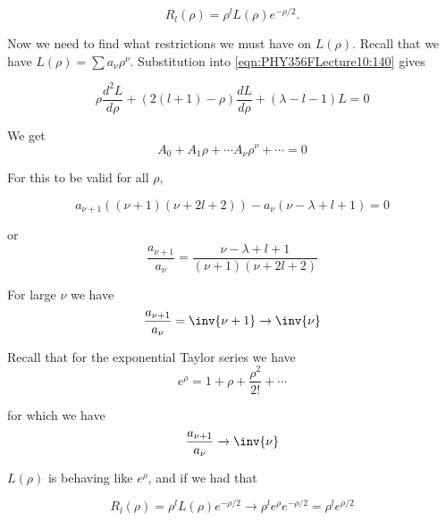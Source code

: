 \begin{equation}\label{eqn:PHY356FLecture10:170}
R_l(\rho) = \rho^l L(\rho) e^{-\rho/2}.
\end{equation}

Now we need to find what restrictions we must have on $L(\rho)$.  Recall that we have $L(\rho) = \sum a_\nu \rho^\nu$.  Substitution into \ref{eqn:PHY356FLecture10:140} gives

\begin{equation}\label{eqn:PHY356FLecture10:180}
\rho \frac{d^2 L}{d\rho} + \left( 2(l+1) - \rho \right) \frac{d L}{d \rho} + (\lambda - l - 1) L = 0
\end{equation}

We get
\begin{equation}\label{eqn:PHY356FLecture10:190}
A_0 + A_1 \rho + \cdots A_\nu \rho^\nu + \cdots = 0
\end{equation}

For this to be valid for all $\rho$,

\begin{equation}\label{eqn:PHY356FLecture10:200}
a_{\nu+1} \left(
(\nu+1)(\nu+ 2l + 2)
\right)
-
a_{\nu} \left(
\nu - \lambda + l + 1
\right)
=0
\end{equation}

or
\begin{equation}\label{eqn:PHY356FLecture10:210}
\frac{a_{\nu+1}}{ a_{\nu} }
=
\frac{ \nu - \lambda + l + 1 }{ (\nu+1)(\nu+ 2l + 2) }
\end{equation}

For large $\nu$ we have
\begin{equation}\label{eqn:PHY356FLecture10:220}
\frac{a_{\nu+1}}{ a_{\nu} }
=
\inv{\nu+1}
\rightarrow \inv{\nu}
\end{equation}

Recall that for the exponential Taylor series we have
\begin{equation}\label{eqn:PHY356FLecture10:230}
e^\rho = 1 + \rho + \frac{\rho^2}{2!} + \cdots
\end{equation}

for which we have
\begin{equation}\label{eqn:PHY356FLecture10:240}
\frac{a_{\nu+1}}{a_\nu} \rightarrow \inv{\nu}
\end{equation}

$L(\rho)$ is behaving like $e^\rho$, and if we had that

\begin{equation}\label{eqn:PHY356FLecture10:250}
R_l(\rho) = \rho^l L(\rho) e^{-\rho/2} \rightarrow \rho^l e^\rho e^{-\rho/2} = \rho^l e^{\rho/2}
\end{equation}

